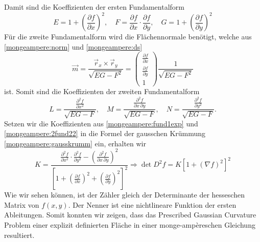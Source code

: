 Damit sind die Koeffizienten der ersten Fundamentalform 
\begin{equation}
  E = 1 + \left(\frac{\partial f}{\partial x}\right)^2, \quad
  F = \frac{\partial f}{\partial x} \cdot \frac{\partial f}{\partial y}, \quad
  G = 1 + \left(\frac{\partial f}{\partial y}\right)^2
  \label{mongeampere:fund1exp}
\end{equation}
Für die zweite Fundamentalform wird die Flächennormale benötigt, welche aus \eqref{mongeampere:norm} und \eqref{mongeampere:ds} 
\begin{equation}
  \vec m = \frac{\vec r_x \times \vec r_y}{\sqrt{EG-F^2}} = \begin{pmatrix}
    \frac{\partial f}{\partial x} \\
    \frac{\partial f}{\partial y} \\
    1
  \end{pmatrix}
  \frac{1}{\sqrt{EG-F^2}}
  \label{mongeampere:norm2}
\end{equation}
ist.
Somit sind die Koeffizienten der zweiten Fundamentalform
\begin{equation}
  L = \frac{\displaystyle\frac{\partial^2 f}{\partial x^2}}{\sqrt{EG-F}}, \quad
  M = \frac{\displaystyle\frac{\partial^2 f}{\partial x \, \partial y}}{\sqrt{EG-F}}, \quad
  N = \frac{\displaystyle\frac{\partial^2 f}{\partial y^2}}{\sqrt{EG-F}}.
  \label{mongeampere:2fund22}
\end{equation}
Setzen wir die Koeffizienten aus \eqref{mongeampere:fund1exp} und \eqref{mongeampere:2fund22} in die Formel der gausschen Krümmung \eqref{mongeampere:gausskrumm}
ein, erhalten wir
\begin{equation}
  K = \frac{
    \displaystyle\frac{\partial^2 f}{\partial x^2} \cdot \displaystyle\frac{\partial^2 f}{\partial y^2} - \left(\displaystyle\frac{\partial^2 f}{\partial x \, \partial y} \right)^2}
    {\left[1 + 
    \left(\displaystyle\frac{\partial f}{\partial x}\right)^2 +
    \left(\displaystyle\frac{\partial f}{\partial y}\right)^2\right]^2} \Rightarrow
    \det D^2 f = K \left[ 1 + 
    \left(\nabla f\right)^2\right]^2
    \label{mongeampere:pd}
\end{equation}
Wie wir sehen können, ist der Zähler gleich der Determinante der hesseschen Matrix von $f(x,y)$.
Der Nenner ist eine nichtlineare Funktion der ersten Ableitungen.
Somit konnten wir zeigen, dass das Prescribed Gaussian Curvature Problem einer explizit definierten Fläche in einer 
monge-ampèreschen Gleichung resultiert.

